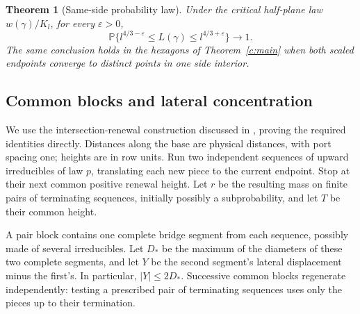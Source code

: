 \documentclass[11pt]{article}
\numberwithin{equation}{section}
\newtheorem{theorem}{Theorem}[section]
\theoremstyle{definition}\newtheorem{definition}[theorem]{Definition}
\theoremstyle{remark}\newtheorem{remark}[theorem]{Remark}
\begin{document}
\begin{theorem}[Same-side probability law]\label{c:same-side-law}
Under the critical half-plane law $w(\gamma)/K_l$, for every
$\varepsilon>0$,
\[
 \mathbb P\{l^{4/3-\varepsilon}\le L(\gamma)
                   \le l^{4/3+\varepsilon}\}\longrightarrow1.
\]
The same conclusion holds in the hexagons of Theorem~\ref{c:main} when both scaled
endpoints converge to distinct points in one side interior.
\end{theorem}
\subsection{Common blocks and lateral concentration}
We use the intersection-renewal construction discussed in
\cite[Section~1.1]{AlexanderBerger2016}, proving the required identities
directly. Distances along the base are physical distances, with port
spacing one; heights are in row units. Run two independent sequences of
upward irreducibles of law $p$, translating each new piece to the current
endpoint. Stop at their next common positive renewal height. Let $r$ be
the resulting mass on finite pairs of terminating sequences, initially
possibly a subprobability, and let $T$ be their common height.

A pair block contains one complete bridge segment from each sequence,
possibly made of several irreducibles. Let $D_*$ be the maximum of the
diameters of these two complete segments, and let $Y$ be the second
segment's lateral displacement minus the first's. In particular,
$|Y|\le2D_*$. Successive common blocks regenerate independently: testing
a prescribed pair of terminating sequences uses only the pieces up to
their termination.
\end{document}

